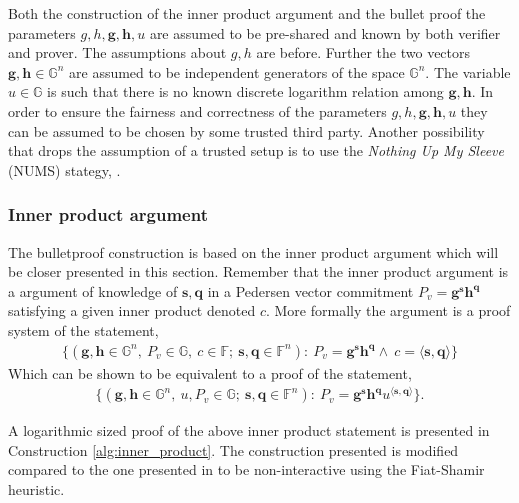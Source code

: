 Both the construction of the inner product argument and the bullet proof the parameters $g,h,\mathbf{g},\mathbf{h},u$ are assumed to be pre-shared and known by both verifier and prover. The assumptions about $g,h$ are before. Further the two vectors $\mathbf{g}, \mathbf{h} \in \mathds{G}^n$ are assumed to be independent generators of the space $\mathds{G}^n$. The variable $u\in\mathds{G}$ is such that there is no known discrete logarithm relation among $\mathbf{g},\mathbf{h}$. In order to ensure the fairness and correctness of the parameters $g,h,\mathbf{g},\mathbf{h},u$ they can be  assumed to be chosen by some trusted third party. Another possibility that drops the assumption of a trusted setup is to use the \textit{Nothing Up My Sleeve} (NUMS) stategy, \cite{ZKRP_Morais}.

\subsubsection*{Inner product argument}
\label{sec:inner_prod}
The bulletproof construction is based on the inner product argument which will be closer presented in this section. Remember that the inner product argument is a argument of knowledge of $\textbf{s},\mathbf{q}$ in a  Pedersen vector commitment $P_v=\mathbf{g}^\mathbf{s}\mathbf{h}^\mathbf{q}$ satisfying a given inner product denoted $c$. 
More formally the argument is a proof system of the statement,
\begin{align*}
    \{(\mathbf{g},\mathbf{h}\in\mathds{G}^n,\:P_v\in\mathds{G},\:c\in\mathds{F};\: \mathbf{s},\mathbf{q}\in\mathds{F}^n) : \: P_v=\mathbf{g}^\mathbf{s}\mathbf{h}^\mathbf{q}\wedge\: c =\langle\mathbf{s},\mathbf{q}\rangle\}
\end{align*}
Which can be shown to be equivalent to a proof of the statement,
\begin{align}
\label{eq:IPA}
    \{(\mathbf{g},\mathbf{h}\in\mathds{G}^n,\: u,P_v\in\mathds{G};\: \mathbf{s},\mathbf{q}\in\mathds{F}^n) : \: P_v=\mathbf{g}^\mathbf{s}\mathbf{h}^\mathbf{q}u^{\langle\mathbf{s},\mathbf{q}\rangle}\}.
\end{align}

A logarithmic sized proof of the above inner product statement is presented in Construction \ref{alg:inner_product}. The construction presented is modified compared to the one presented in \cite{bulletProofs_theory} to be non-interactive using the Fiat-Shamir heuristic.

